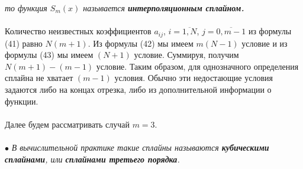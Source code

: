 \documentclass[a4paper, 12pt]{report}
\numberwithin{equation}{section}
\begin{document}
	 \textit{то функция $S_m(x)$ называется \textbf{интерполяционным сплайном.}}\\\\
	 Количество неизвестных коэффициентов $a_{ij}$, $i=\overline{1,N}$, $j=\overline{0,m-1}$ из формулы (41) равно $N(m+1)$. Из формулы (42) мы имеем $m(N-1)$ условие и из формулы (43) мы имеем $(N+1)$ условие. Суммируя, получим $N(m+1) - (m-1)$ условие. Таким образом, для однозначного определения сплайна не хватает $(m-1)$ условия. Обычно эти недостающие условия задаются либо на концах отрезка, либо из дополнительной информации о функции.\\\\
	 Далее будем рассматривать случай $m=3$.\\\\
	 $\bullet$ \textit{В вычислительной практике такие сплайны называются \textbf{кубическими сплайнами}, или \textbf{сплайнами третьего порядка}.}
\end{document}
